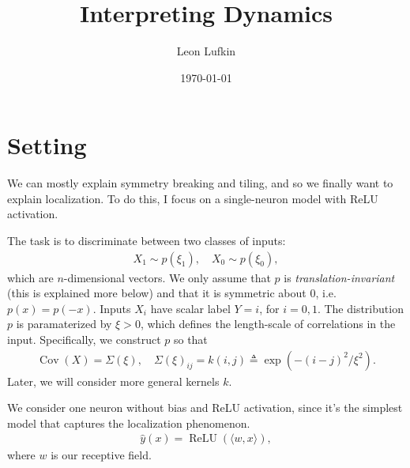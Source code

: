 \documentclass{article}
\title{Interpreting Dynamics}
\author{Leon Lufkin}
\date{\today}
\begin{document}
\section{Setting}
We can mostly explain symmetry breaking and tiling, and so we finally want to explain localization.
To do this, I focus on a single-neuron model with ReLU activation.

The task is to discriminate between two classes of inputs:
\begin{align}
  X_1 \sim p(\xi_1), \quad X_0 \sim p(\xi_0),
\end{align}
which are $n$-dimensional vectors.
We only assume that $p$ is \emph{translation-invariant} (this is explained more below) and that it is symmetric about 0, i.e. $p(x) = p(-x)$.
Inputs $X_i$ have scalar label $Y = i$, for $i = 0, 1$.
The distribution $p$ is paramaterized by $\xi > 0$, which defines the length-scale of correlations in the input.
Specifically, we construct $p$ so that
\begin{align}
  \operatorname{Cov}(X) = \Sigma(\xi), \quad \Sigma(\xi)_{ij} = k(i,j) \triangleq \exp(-(i-j)^2 / \xi^2).
\end{align}
Later, we will consider more general kernels $k$.



We consider one neuron without bias and ReLU activation, since it's the simplest model that captures the localization phenomenon.
\begin{align}
  \hat{y}(x) = \operatorname{ReLU}(\langle w, x \rangle),
\end{align}
where $w$ is our receptive field.

\end{document}
